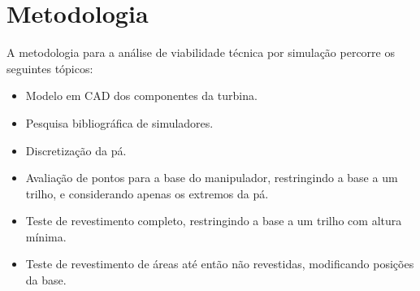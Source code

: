 \section{Metodologia}\label{metodologia}

A metodologia para a análise de viabilidade técnica por simulação percorre os
seguintes tópicos:

\begin{itemize}
  \item Modelo em CAD dos componentes da turbina.
  \item Pesquisa bibliográfica de simuladores.
  \item Discretização da pá.
  \item Avaliação de pontos para a base do manipulador, restringindo a base a um
  trilho, e considerando apenas os extremos da pá.
  \item Teste de revestimento completo, restringindo a base a um trilho com
  altura mínima.
  \item Teste de revestimento de áreas até então não revestidas,
  modificando posições da base.
\end{itemize}
